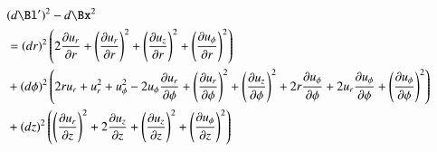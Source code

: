 \begin{equation}\label{eqn:continuumL2:490}
\begin{aligned}
&(d\Bl')^2 - d\Bx^2 \\
&= 
(dr)^2 \left(2 \frac{\partial u_r}{\partial r}+\left(\frac{\partial u_r}{\partial r}\right)^2+\left(\frac{\partial u_z}{\partial r}\right)^2+\left(\frac{\partial u_{\phi }}{\partial r}\right)^2\right) \\
&+(d\phi )^2 \left(2 r u_r+u_r^2+u_{\phi }^2-2 u_{\phi } \frac{\partial u_r}{\partial \phi }+\left(\frac{\partial u_r}{\partial \phi }\right)^2+\left(\frac{\partial u_z}{\partial \phi }\right)^2+2 r \frac{\partial u_{\phi }}{\partial \phi }+2 u_r \frac{\partial u_{\phi }}{\partial \phi }+\left(\frac{\partial u_{\phi }}{\partial \phi }\right)^2\right) \\
&+(dz)^2 \left(\left(\frac{\partial u_r}{\partial z}\right)^2+2 \frac{\partial u_z}{\partial z}+\left(\frac{\partial u_z}{\partial z}\right)^2+\left(\frac{\partial u_{\phi }}{\partial z}\right)^2\right) \\

\end{aligned}
\end{equation}

